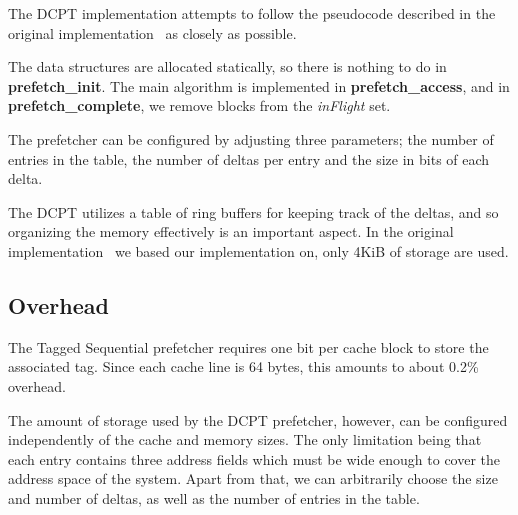 
The DCPT implementation attempts to follow the pseudocode described in the
original implementation~\cite{dcpt} as closely as possible.

The data structures are allocated statically, so there is nothing to do in
\textbf{prefetch\_init}. The main algorithm is implemented in \textbf{prefetch\_access},
and in \textbf{prefetch\_complete}, we remove blocks from the \emph{inFlight}
set.

The prefetcher can be configured by adjusting three parameters; the number of entries
in the table, the number of deltas per entry and the size in bits of each delta.

The DCPT utilizes a table of ring buffers for keeping track of the deltas, and
so organizing the memory effectively is an important aspect. In the original
implementation~\cite{dcpt} we based our implementation on, only 4KiB of storage
are used.


\subsection{Overhead}

The Tagged Sequential prefetcher requires one bit per cache block to store the
associated tag. Since each cache line is 64 bytes, this amounts to about 0.2\%
overhead.

The amount of storage used by the DCPT prefetcher, however, can be configured
independently of the cache and memory sizes. The only limitation being that each
entry contains three address fields which must be wide enough to cover the
address space of the system. Apart from that, we can arbitrarily choose the size
and number of deltas, as well as the number of entries in the table.
